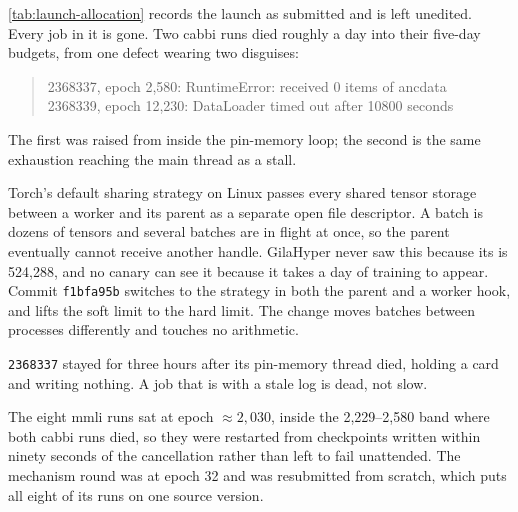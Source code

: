 \cref{tab:launch-allocation} records the launch as submitted and is left unedited. Every
job in it is gone. Two cabbi runs died roughly a day into their five-day budgets, from one
defect wearing two disguises:
\begin{quote}\ttfamily\small
2368337, epoch 2{,}580: RuntimeError: received 0 items of ancdata\\
2368339, epoch 12{,}230: DataLoader timed out after 10800 seconds
\end{quote}
The first was raised from inside the pin-memory loop; the second is the same exhaustion
reaching the main thread as a stall.

 Torch's default sharing strategy on Linux passes every shared tensor
storage between a worker and its parent as a separate open file descriptor. A
 batch is dozens of tensors and several batches are in flight at once, so
the parent eventually cannot receive another handle. GilaHyper never saw this because its
 is 524{,}288, and no canary can see it because it takes a day of
training to appear. Commit \texttt{f1bfa95b} switches to the  strategy in
both the parent and a worker hook, and lifts the soft limit to the hard limit. The change
moves batches between processes differently and touches no arithmetic.

 \texttt{2368337} stayed
 for three hours after its pin-memory thread died, holding a card and writing
nothing. A job that is  with a stale log is dead, not slow.

 The eight mmli runs sat at epoch $\approx 2{,}030$, inside the
2{,}229--2{,}580 band where both cabbi runs died, so they were restarted from checkpoints
written within ninety seconds of the cancellation rather than left to fail unattended. The
mechanism round was at epoch 32 and was resubmitted from scratch, which puts all eight of
its runs on one source version.

